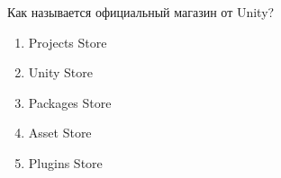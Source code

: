 
Как называется официальный магазин от Unity?

\begin{enumerate}
    \item Projects Store
    \item Unity Store
    \item Packages Store
    \item Asset Store
    \item Plugins Store
\end{enumerate}

